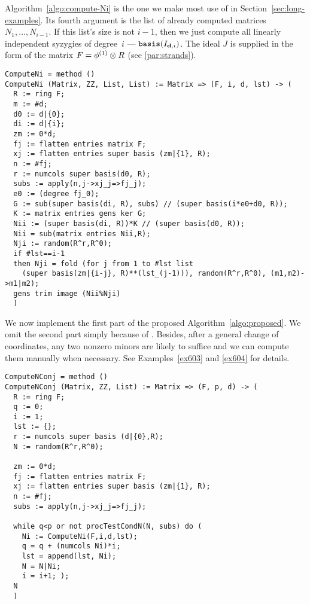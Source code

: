 \documentclass[fleqn,reqno]{amsart}
\begin{document}
\begin{paragraf}
\label{code:algo:compute-Ni}
Algorithm~\ref{algo:compute-Ni} is the one we make most use of in Section~\ref{sec:long-examples}.
Its fourth argument is the list of already computed matrices $N_1,\ldots,N_{i-1}$.
If this list's size is not $i-1$,
then we just compute all linearly independent syzygies of degree~$i$ --- $\mathop{\tt basis}(I_{\mathbf d,i})$.
The ideal $J$ is supplied in the form of the matrix
$F=\phi^{(1)}\otimes R$ (see \ref{par:strands}).
\begin{verbatim}
ComputeNi = method ()
ComputeNi (Matrix, ZZ, List, List) := Matrix => (F, i, d, lst) -> (
  R := ring F;
  m := #d;
  d0 := d|{0};
  di := d|{i};
  zm := 0*d;
  fj := flatten entries matrix F;
  xj := flatten entries super basis (zm|{1}, R);
  n := #fj;
  r := numcols super basis(d0, R);
  subs := apply(n,j->xj_j=>fj_j);
  e0 := (degree fj_0);
  G := sub(super basis(di, R), subs) // (super basis(i*e0+d0, R));
  K := matrix entries gens ker G;
  Nii := (super basis(di, R))*K // (super basis(d0, R));
  Nii = sub(matrix entries Nii,R);
  Nji := random(R^r,R^0);
  if #lst==i-1
  then Nji = fold (for j from 1 to #lst list
    (super basis(zm|{i-j}, R)**(lst_(j-1))), random(R^r,R^0), (m1,m2)->m1|m2);
  gens trim image (Nii%Nji)
  )
\end{verbatim}
\end{paragraf}

\begin{paragraf}
\label{code:algo:proposed}
We now implement the first part of the proposed Algorithm~\ref{algo:proposed}.
We omit the second part simply because of .
Besides, after a general change of coordinates,
any two nonzero minors are likely to suffice and we can compute them manually when necessary.
See Examples~\ref{ex603} and \ref{ex604} for details.
\begin{verbatim}
ComputeNConj = method ()
ComputeNConj (Matrix, ZZ, List) := Matrix => (F, p, d) -> (
  R := ring F;
  q := 0;
  i := 1;
  lst := {};
  r := numcols super basis (d|{0},R);
  N := random(R^r,R^0);
  
  zm := 0*d;
  fj := flatten entries matrix F;
  xj := flatten entries super basis (zm|{1}, R);
  n := #fj;
  subs := apply(n,j->xj_j=>fj_j);
  
  while q<p or not procTestCondN(N, subs) do (
    Ni := ComputeNi(F,i,d,lst);
    q = q + (numcols Ni)*i;
    lst = append(lst, Ni);
    N = N|Ni;
    i = i+1; );
  N
  )
\end{verbatim}
\end{paragraf}
\end{document}
